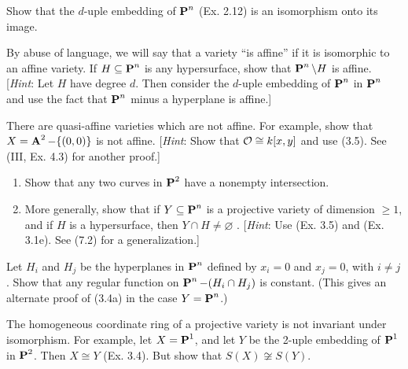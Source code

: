 \documentclass[10pt]{amsart}
\begin{document}
\begin{exercise}[3.4]
    Show that the $d$-uple embedding of $\pp^n$ (Ex. 2.12) is an isomorphism 
    onto its image.
\end{exercise}


\begin{exercise}[3.5]
    By abuse of language, we will say that a variety ``is affine'' if it is 
    isomorphic to an affine variety. If $H \subseteq \pp^n$ is any hypersurface, 
    show that $\pp^n \setminus H$ is affine. 
    [\emph{Hint}: Let $H$ have degree $d$. Then consider the $d$-uple 
    embedding of $\pp^n$ in $\pp^n$ and use the fact that $\pp^n$ minus 
    a hyperplane is affine.]
\end{exercise}


\begin{exercise}[3.6]
    There are quasi-affine varieties which are not affine. For example, show that 
    $X = \aa^2 - \{(0,0)\}$ is not affine. [\emph{Hint}: Show 
    that $\cO \cong k[x,y]$
    and use (3.5). See (III, Ex. 4.3) for another proof.]
\end{exercise}


\begin{exercise}[3.7]  
    \begin{enumerate}[itemsep=1pt]
        \item Show that any two curves in $\pp^2$ have a nonempty intersection.
        \item More generally, show that if $Y \subseteq \pp^n$ is a projective variety of 
        dimension $\ge 1$, and if $H$ is a hypersurface, then $Y \cap H \ne \varnothing$ . 
        [\emph{Hint}: Use (Ex. 3.5) and (Ex. 3.1e). See (7.2) for a generalization.]
    \end{enumerate}
\end{exercise}


\begin{exercise}[3.8]
    Let $H_i$ and $H_j$ be the hyperplanes in $\pp^n$ defined by 
    $x_i = 0$ and $x_j = 0$, with $i \ne j$. Show that any regular function on 
    $\pp^n - (H_i \cap H_j)$ is constant. 
    (This gives an alternate proof of (3.4a) in the case $Y = \pp^n$.)
\end{exercise}


\begin{exercise}[3.9]
    The homogeneous coordinate ring of a projective variety is not invariant under 
    isomorphism. For example, let $X = \pp^1$, and let $Y$ be the 2-uple embedding of $\pp^1$ in $\pp^2$. 
    Then $X \cong Y$ (Ex. 3.4). But show that $S(X) \not\cong S(Y)$.
\end{exercise}
\end{document}
